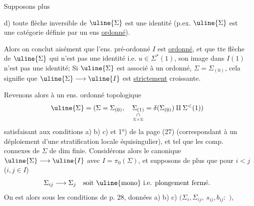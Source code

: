 Supposons  plus

d) toute flèche inversible de $\uline{\Sigma}$ est une identité
(p.ex. $\uline{\Sigma}$ est une catégorie définie par un ens
\uline{ordonné}).

Alors on conclut aisément que l'ens. pré-ordonné $I$ est
\uline{ordonné}, et que tte flèche de $\uline{\Sigma}$ qui n'est pas
une identité i.e. $u\in\Sigma^{*}(1)$, son image dans $I(1)$
n'est pas une identité;
 Si $\uline{\Sigma}$ est associé à un
ordonné, $\Sigma=\Sigma_{(0)}$, cela signifie que
$\uline{\Sigma}\longrightarrow\uline{I}$ est 
\uline{strictement} croissante.

Revenons alors à un  ens. ordonné topologique
\[
\uline{\Sigma}=(\Sigma=\Sigma_{(0)},\quad
\underset{\underset{\Sigma\times\Sigma}{\cap}}{\Sigma_{(1)}}
=\delta(\Sigma_{(0)})\amalg\Sigma^{<}(1))
\]
satisfaisant aux conditions a) b) c) et 1°) de la page (27)
(correspondant  à un déploiement d'une
stratification locale équisingulier), et tel que les comp. connexes
de $\Sigma$  de dim finie.
Considérons alors le 
canonique $\uline{\Sigma}\longrightarrow\uline{I}$ avec $I=\pi_0(\Sigma)$,
et supposons de plus que pour $i<j$ ($i,j\in I$)
\[
\Sigma_{ij}\longrightarrow\Sigma_j\quad\hbox{soit \uline{mono} i.e. plongement fermé.}
\]
On est alors sous les conditions de p. 28,
données a) b) c)
$(\Sigma_i,\Sigma_{ij},\ s_{ij},b_{ij}:$
$)$,
